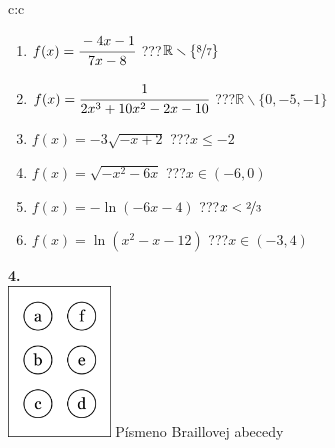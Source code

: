 \documentclass[10pt]{report}
\begin{document}
\begin{tabular}{c:c}
\begin{minipage}[c][104.5mm][t]{0.5\linewidth}
\begin{center}
\begin{minipage}{0.79\linewidth}
\begin{center}
\begin{varwidth}{\linewidth}
\begin{enumerate}
\normalsizerrr
\item $f(x)=\cfrac{-4x-1}{7x-8}$\quad \dotfill\; ???\;\dotfill \quad $\mathbb{R}\smallsetminus\{\nicefrac{8}{7}\}$
\item $f(x)=\cfrac{1}{2x^3+10x^2-2x-10}$\quad \dotfill\; ???\;\dotfill \quad $\mathbb{R}\smallsetminus\{0,-5,-1\}$
\item $f(x)=-3\sqrt{-x+2}$\quad \dotfill\; ???\;\dotfill \quad $x\leq-2$
\item $f(x)=\sqrt{-x^2-6x}$\quad \dotfill\; ???\;\dotfill \quad $x\in(-6 , 0)$
\item $f(x)=-\ln{(-6x-4)}$\quad \dotfill\; ???\;\dotfill \quad $x<\nicefrac{2}{3}$
\item $f(x)=\ln{(x^2-x-12)}$\quad \dotfill\; ???\;\dotfill \quad $x\in(-3 , 4)$
\end{enumerate}
\end{varwidth}
\end{center}
\end{minipage}
\begin{minipage}{0.20\linewidth}
\begin{center}
{\Huge\bfseries 4.} \\[2mm]
\includegraphics[height=40mm]{../images/braille.png}
{\small Písmeno Braillovej abecedy}
\end{center}
\end{minipage}
\end{center}
\end{minipage}
%
\end{tabular}
\newpage
\thispagestyle{empty}
\end{document}
